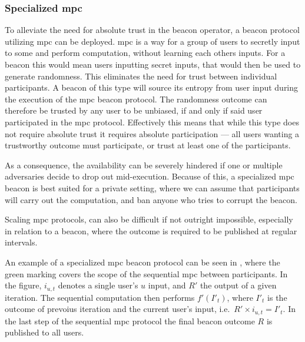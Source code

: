 \subsubsection{Specialized \gls{mpc}}\label{ssub:specialized_mpc}
To alleviate the need for absolute trust in the beacon operator, a beacon protocol utilizing \acrfull{mpc} \cite{goldreich1998secure} can be deployed. \gls{mpc} is a way for a group of users to secretly input to some and perform computation, without learning each others inputs. For a beacon this would mean users inputting secret inputs, that would then be used to generate randomness.   
This eliminates the need for trust between individual participants.
A beacon of this type will source its entropy from user input during the execution of the \gls{mpc} beacon protocol.
The randomness outcome can therefore be trusted by any user to be unbiased, if and only if said user participated in the \gls{mpc} protocol.
Effectively this means that while this type does not require absolute trust it requires absolute participation --- all users wanting a trustworthy outcome must participate, or trust at least one of the participants.

As a consequence, the availability can be severely hindered if one or multiple adversaries decide to drop out mid-execution.
Because of this, a specialized \gls{mpc} beacon is best suited for a private setting, where we can assume that participants will carry out the computation, and ban anyone who tries to corrupt the beacon.

Scaling \gls{mpc} protocols, can also be difficult if not outright impossible, especially in relation to a beacon, where the outcome is required to be published at regular intervals.

An example of a specialized \gls{mpc} beacon protocol can be seen in , where the green marking covers the scope of the sequential \gls{mpc} between participants.
In the figure, $i_{u,t}$ denotes a single user's $u$ input, and $R'$ the output of a given iteration.
The sequential computation then performs $f'(I'_t)$, where $I'_t$ is the outcome of prevoius iteration and the current user's input, i.e.\ $R' \times i_{u,t} = I'_t$.
In the last step of the sequential \gls{mpc} protocol the final beacon outcome $R$ is published to all users.

